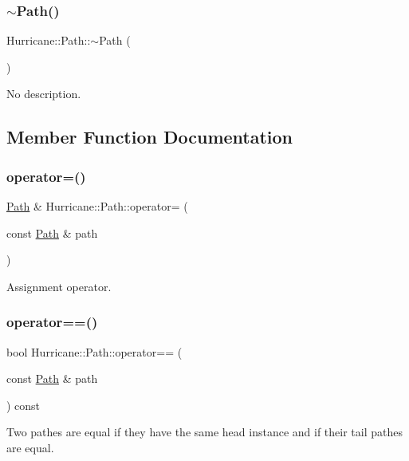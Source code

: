 \subsubsection{\texorpdfstring{$\sim$\+Path()}{~Path()}}
{\footnotesize\ttfamily Hurricane\+::\+Path\+::$\sim$\+Path (\begin{DoxyParamCaption}{ }\end{DoxyParamCaption})}

No description. 

\subsection{Member Function Documentation}
\mbox{\label{classHurricane_1_1Path_a1355dd2d191d492a1b5e5180324a9f8f}} 
\subsubsection{\texorpdfstring{operator=()}{operator=()}}
{\footnotesize\ttfamily \mbox{\hyperlink{classHurricane_1_1Path}{Path}} \& Hurricane\+::\+Path\+::operator= (\begin{DoxyParamCaption}\item[{const \mbox{\hyperlink{classHurricane_1_1Path}{Path}} \&}]{path }\end{DoxyParamCaption})}

Assignment operator. \mbox{\label{classHurricane_1_1Path_a16a5b6529dd4424c55518ac9f687862f}} 
\subsubsection{\texorpdfstring{operator==()}{operator==()}}
{\footnotesize\ttfamily bool Hurricane\+::\+Path\+::operator== (\begin{DoxyParamCaption}\item[{const \mbox{\hyperlink{classHurricane_1_1Path}{Path}} \&}]{path }\end{DoxyParamCaption}) const}

Two pathes are equal if they have the same head instance and if their tail pathes are equal. \mbox{\label{classHurricane_1_1Path_a182e82a2bc3f41262e1e76fcdc5a0c1e}} 
